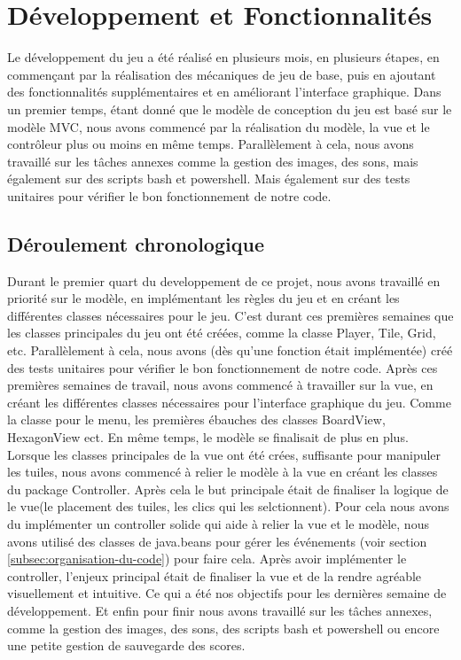\documentclass{article}
\begin{document}
    \section{Développement et Fonctionnalités}\label{sec:developpement-et-fonctionnalites}

    Le développement du jeu a été réalisé en plusieurs mois, en plusieurs étapes, en commençant par la réalisation des mécaniques de jeu de base, puis en ajoutant des fonctionnalités supplémentaires et en améliorant l'interface graphique.
    Dans un premier temps, étant donné que le modèle de conception du jeu est basé sur le modèle MVC, nous avons commencé par la réalisation du modèle, la vue et le contrôleur plus ou moins en même temps.
    Parallèlement à cela, nous avons travaillé sur les tâches annexes comme la gestion des images, des sons, mais également sur des scripts bash et powershell.
    Mais également sur des tests unitaires pour vérifier le bon fonctionnement de notre code.

    \subsection{Déroulement chronologique}\label{subsec:deroulement-chronologique}

    Durant le premier quart du developpement de ce projet, nous avons travaillé en priorité sur le modèle, en implémentant les règles du jeu et en créant les différentes classes nécessaires pour le jeu.
    C'est durant ces premières semaines que les classes principales du jeu ont été créées, comme la classe Player, Tile, Grid, etc.
    Parallèlement à cela, nous avons (dès qu'une fonction était implémentée) créé des tests unitaires pour vérifier le bon fonctionnement de notre code.
    Après ces premières semaines de travail, nous avons commencé à travailler sur la vue, en créant les différentes classes nécessaires pour l'interface graphique du jeu.
    Comme la classe pour le menu, les premières ébauches des classes BoardView, HexagonView ect.
    En même temps, le modèle se finalisait de plus en plus.
    Lorsque les classes principales de la vue ont été crées, suffisante pour manipuler les tuiles, nous avons commencé à relier le modèle à la vue en créant les classes du package Controller.
    Après cela le but principale était de finaliser la logique de le vue(le placement des tuiles, les clics qui les selctionnent).
    Pour cela nous avons du implémenter un controller solide qui aide à relier la vue et le modèle, nous avons utilisé des classes de java.beans pour gérer les événements (voir section \ref{subsec:organisation-du-code}) pour faire cela.
    Après avoir implémenter le controller, l'enjeux principal était de finaliser la vue et de la rendre agréable visuellement et intuitive.
    Ce qui a été nos objectifs pour les dernières semaine de développement.
    Et enfin pour finir nous avons travaillé sur les tâches annexes, comme la gestion des images, des sons, des scripts bash et powershell ou encore une petite gestion de sauvegarde des scores.
\end{document}
